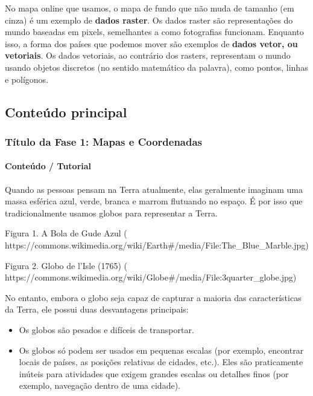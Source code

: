 \documentclass[
]{book}
\providecommand{\tightlist}{%
  \setlength{\itemsep}{0pt}\setlength{\parskip}{0pt}}
\begin{document}
No mapa online que usamos, o mapa de fundo que não muda de tamanho (em cinza) é um exemplo de \textbf{dados raster}. Os dados raster são representações do mundo baseadas em pixels, semelhantes a como fotografias funcionam. Enquanto isso, a forma dos países que podemos mover são exemplos de \textbf{dados vetor, ou vetoriais}. Os dados vetoriais, ao contrário dos rasters, representam o mundo usando objetos discretos (no sentido matemático da palavra), como pontos, linhas e polígonos.

\hypertarget{conteuxfado-principal}{%
\subsection{Conteúdo principal}\label{conteuxfado-principal}}

\hypertarget{tuxedtulo-da-fase-1-mapas-e-coordenadas}{%
\subsubsection{Título da Fase 1: Mapas e Coordenadas}\label{tuxedtulo-da-fase-1-mapas-e-coordenadas}}

\hypertarget{conteuxfado-tutorial}{%
\paragraph{Conteúdo / Tutorial}\label{conteuxfado-tutorial}}

Quando as pessoas pensam na Terra atualmente, elas geralmente imaginam uma massa esférica azul, verde, branca e marrom flutuando no espaço. É por isso que tradicionalmente usamos globos para representar a Terra.

Figura 1. A Bola de Gude Azul ( https://commons.wikimedia.org/wiki/Earth\#/media/File:The\_Blue\_Marble.jpg)

Figura 2. Globo de l'Isle (1765) ( https://commons.wikimedia.org/wiki/Globe\#/media/File:3quarter\_globe.jpg)

No entanto, embora o globo seja capaz de capturar a maioria das características da Terra, ele possui duas desvantagens principais:

\begin{itemize}
\tightlist
\item
  Os globos são pesados e difíceis de transportar.
\item
  Os globos só podem ser usados em pequenas escalas (por exemplo, encontrar locais de países, as posições relativas de cidades, etc.). Eles são praticamente inúteis para atividades que exigem grandes escalas ou detalhes finos (por exemplo, navegação dentro de uma cidade).
\end{itemize}
\end{document}
